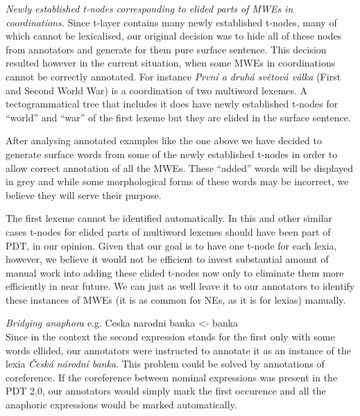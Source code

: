 \begin{itemize}
%
\item \emph{Newly established t-nodes corresponding to elided parts of MWEs in coordinations.} Since t-layer contains many newly established t-nodes, many of which cannot be lexicalised, our original decision was to hide all of these nodes from annotators and generate for them pure surface sentence. This decision resulted however in the current situation, when some MWEs in coordinations cannot be correctly annotated. 
For instance \emph{První a druhá světová válka} (First and Second World War) is a coordination of two multiword lexemes. A tectogrammatical tree that includes it does have newly established t-nodes for “world” and “war” of the first lexeme but they are elided in the surface sentence. 

After analysing annotated examples like the one above we have decided to generate surface words from some of the newly established t-nodes in order to allow correct annotation of all the MWEs. These ``added'' words will be displayed in grey and while some morphological forms of these words may be incorrect, we believe they will serve their purpose.

{\xxx The first lexeme cannot be identified automatically. In this and other similar cases t-nodes for elided parts of multiword lexemes should have been part of PDT, in our opinion. Given that our goal is to have one t-node for each lexia, however, we believe it would not be efficient to invest substantial amount of manual work into adding these elided t-nodes now only to eliminate them more efficiently in near future. We can just as well leave it to our annotators to identify these instances of MWEs (it is as common for NEs, as it is for lexias) manually.

\item \emph{Bridging anaphora} e.g. Ceska narodni banka <- banka \\
Since in the context the second expression stands for the first only with some words ellided, our annotators were instructed to annotate it as an instance of the lexia \emph{Česká národní banka}. 
This problem could be solved by annotations of coreference. If the coreference between nominal expressions was present in the PDT 2.0, our annotators would simply mark the first occurence and all the anaphoric expressions would be marked automatically. 
} %
\end{itemize}


